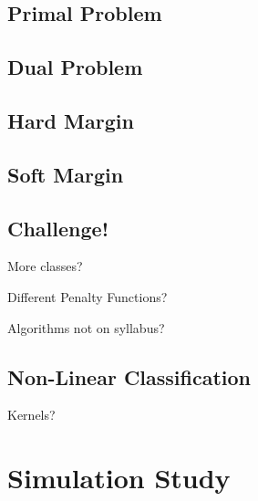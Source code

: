 \documentclass[10pt, a4paper]{amsart}
\begin{document}
\subsection{Primal Problem}

\subsection{Dual Problem}













%

\subsection{Hard Margin}

\subsection{Soft Margin}

\subsection{Challenge!}\hfill

More classes?

Different Penalty Functions?

Algorithms not on syllabus?

\subsection{Non-Linear Classification}\hfill

Kernels?


\section{Simulation Study}
\end{document}
